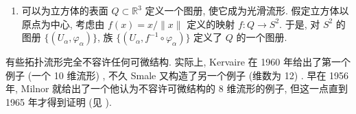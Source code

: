 \begin{RiemannExample}
\begin{enumerate}[label=(\arabic*),ref=\arabic*,leftmargin=*]
\[\begin{aligned}
  \varphi_i^+&:U\subset\mathbb{R}^n\to S^n\\
  (x^1,\ldots,x^n)&\mapsto(x^1,\ldots,x^{i-1},g(x^1,\ldots,x^n),x^i,\ldots,x^n),
  \end{aligned}
\]
\[
  \begin{aligned}
  \varphi_i^-&:U\subset\mathbb{R}^n\to S^n\\
  (x^1,\ldots,x^n)&\mapsto(x^1,\ldots,x^{i-1},-g(x^1,\ldots,x^n),x^i,\ldots,x^n),
  \end{aligned}
\]
其中
\[
  U=\{(x^1,\ldots,x^n)\in\mathbb{R}^n\mid (x^1)^2+\cdots+(x^n)^2<1\}
\]
且
\[
  g(x^1,\ldots,x^n)=\bigl(1-(x^1)^2-\cdots-(x^n)^2\bigr)^{\frac12}.
\]
球面是 $\mathbb{R}^{n+1}$ 的子集, 因而 (赋予子空间拓扑后) 是 Hausdorff 空间, 且具有可数的开集基. 也容易检验族 $\{(U,\varphi_i^+),(U,\varphi_i^-)\}_{i=1}^{n+1}$ 是 $S^n$ 的图册, 因而这个空间是 $n$ 维流形 (相应的坐标图恰是到超平面 $x^i=0$ 的投影).
\item 可以为立方体的表面 $Q\subset\mathbb{R}^3$ 定义一个图册, 使它成为光滑流形. 假定立方体以原点为中心, 考虑由 $f(x)=x/\lVert x\rVert$ 定义的映射 $f:Q\to S^2$. 于是, 对 $S^2$ 的图册 $\{(U_\alpha,\varphi_\alpha)\}$, 族 $\{(U_\alpha,f^{-1}\circ\varphi_\alpha)\}$ 定义了 $Q$ 的一个图册.
\end{enumerate}
\end{RiemannExample}

\begin{RiemannRemark}\label{rem:topological-manifolds-without-smooth-structure}
有些拓扑流形完全不容许任何可微结构. 实际上, Kervaire 在 1960 年给出了第一个例子 (一个 10 维流形) , 不久 Smale 又构造了另一个例子 (维数为 12) . 早在 1956 年, Milnor  就给出了一个他认为不容许可微结构的 8 维流形的例子, 但这一点直到 1965 年才得到证明 (见 ).
\end{RiemannRemark}

